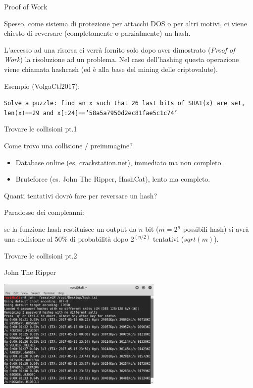 \documentclass[handout, xcolor=dvipsnames,aspectratio=169]{beamer}
\begin{document}
\begin{frame}{Proof of Work}
    \pause

    Spesso, come sistema di protezione per attacchi DOS o per altri motivi, ci viene chiesto di reversare (completamente o parzialmente) un hash.
    
    \pause \medskip
        
    L'accesso ad una risorsa ci verrà fornito solo dopo aver dimostrato (\textit{Proof of Work}) la risoluzione ad un problema.
    Nel caso dell'hashing questa operazione viene chiamata hashcash (ed è alla base del mining delle criptovalute).
    
    \medskip
    
    \pause

    Esempio (VolgaCtf2017):
    
    \texttt{Solve a puzzle: find an x such that 26 last bits of SHA1(x) are set, len(x)==29 and x[:24]=='58a5a7950d2ec81fae5c1c74'}
    
\end{frame}

\begin{frame}{Trovare le collisioni pt.1}

    Come trovo una collisione / preimmagine?
    
    \pause

    \begin{itemize}
      \item Database online (es. crackstation.net), immediato ma non completo.
      \item Bruteforce (es. John The Ripper, HashCat), lento ma completo.
    \end{itemize}
    
    \medskip
    \pause
    
    Quanti tentativi dovrò fare per reversare un hash?
    
    \pause
    \medskip
    
    Paradosso dei compleanni: 
    
    se la funzione hash restituisce un output da $n$ bit ($m = 2^n$ possibili hash) si avrà una collisione al 50\% di probabilità dopo $2^{(n/2)}$ tentativi ($sqrt(m)$).
    
\end{frame}

\begin{frame}{Trovare le collisioni pt.2}

    John The Ripper
    
    \medskip
    
    \centering\includegraphics[width=8cm]{img/john}
    
\end{frame}
    
\end{document}
